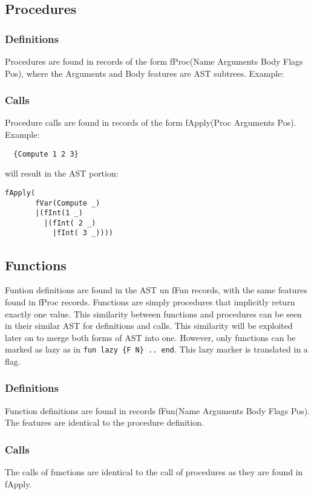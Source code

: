 \documentclass[a4paper]{memoir}
\begin{document}
\subsection{Procedures}\label{sec:input:procedures}
\subsubsection{Definitions}
Procedures are found in records of the form fProc(Name Arguments Body Flags Pos), where the Arguments and Body features are AST subtrees. %
Example:

\subsubsection{Calls}
Procedure calls are found in records of the form fApply(Proc Arguments Pos). 
Example:

\begin{lstlisting}
  {Compute 1 2 3}
\end{lstlisting}

will result in the AST portion:
\begin{verbatim}
fApply(
       fVar(Compute _)
       |(fInt(1 _)
         |(fInt( 2 _)
           |fInt( 3 _))))
\end{verbatim}

\subsection{Functions}\label{sec:input:functions}
Funtion definitions are found in the AST un fFun records, with the same features found in fProc records. Functions are simply procedures that implicitly return exactly one value. This similarity between functions and procedures can be seen in their similar AST for definitions and calls. This similarity will be exploited later on to merge both forms of AST into one.
However, only functions can be marked as lazy as in \lstinline!fun lazy {F N} .. end!. This lazy marker is translated in a flag.
\subsubsection{Definitions}
Function definitions are found in records fFun(Name Arguments Body Flags Pos). The features are identical to the procedure definition.
\subsubsection{Calls}
The calls of functions are identical to the call of procedures as they are found in fApply.
\end{document}

